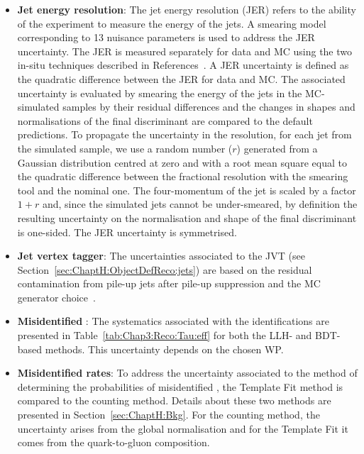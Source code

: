 \begin{itemize}
	\item \textbf{Jet energy resolution}: The jet energy resolution (JER) refers to the ability of the
		experiment to measure the energy of the jets. A smearing model corresponding to 13 
		nuisance parameters is used to address  the JER uncertainty.
		The JER is measured separately for data and MC using the two in-situ techniques
		described in References~\cite{ATLAS:2020cli, ATLAS:2017bje}. A JER uncertainty is 
		defined as the quadratic difference between the JER for data and MC. The associated uncertainty
		is evaluated by smearing the energy of the jets in the MC-simulated samples by their residual
		differences and the changes in shapes and normalisations of the final discriminant are 
		compared to the default predictions.%
		To propagate the uncertainty in the \pT resolution, for each jet from the simulated sample, we use a random 
		number ($r$) generated from a Gaussian distribution centred at zero and with a root mean square equal to
		the quadratic difference between the fractional \pT resolution with the smearing tool and the nominal one. 
		The  four-momentum of the jet is scaled by a factor $1+r$ and, since the simulated jets cannot be
		under-smeared, by definition the resulting uncertainty on the normalisation and shape of the final 
		discriminant is one-sided. The JER uncertainty is symmetrised. 

	\item \textbf{Jet vertex tagger}: The uncertainties associated to the JVT (see 
		Section~\ref{sec:ChaptH:ObjectDefReco:jets}) are based on the residual 
		contamination from pile-up jets after pile-up suppression and the MC 
		generator choice~\cite{ATLAS-CONF-2014-018,ATLAS:2017ywy}.
	
	\item \textbf{Misidentified \tauhad}: 
		The systematics associated with the \tauhad  identifications are presented
		in Table~\ref{tab:Chap3:Reco:Tau:eff}
		for both the LLH- and BDT-based methods. This uncertainty depends on
		the chosen WP.
	
	\item \textbf{Misidentified \tauhad rates}: To address the uncertainty associated to the method
		of determining the probabilities of misidentified \tauhad, the Template Fit method is 
		compared to the counting method. Details about these two methods are
		presented in Section~\ref{sec:ChaptH:Bkg}.
		For the counting method, the uncertainty arises from the global normalisation
		and for the Template Fit it comes from the quark-to-gluon composition.
	

\end{itemize}
